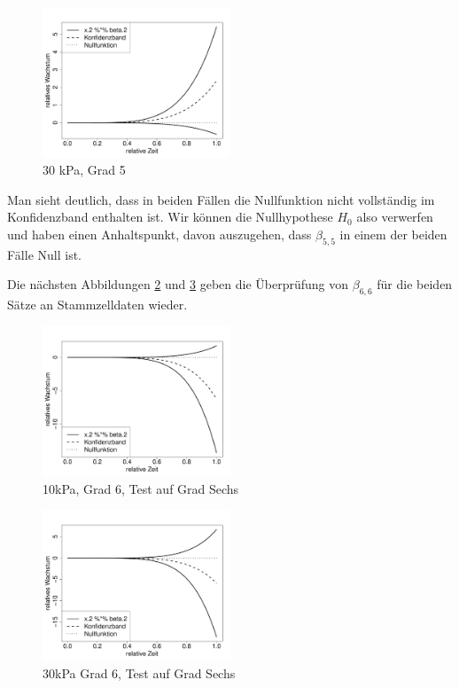 \documentclass[12pt,a4paper]{article}
\theoremstyle{definition}
\theoremstyle{definition}
\theoremstyle{definition}
\theoremstyle{definition}
\begin{document}
\begin{figure}[H] 
  \centering
     \includegraphics[width=0.5\textwidth]{30kPa-Grad-5-KB}
  \caption{30 kPa, Grad 5}
  \label{30kPa Grad 5}
\end{figure}

Man sieht deutlich, dass in beiden Fällen die Nullfunktion nicht vollständig im Konfidenzband enthalten ist. Wir können die Nullhypothese $H_0$ also verwerfen und haben einen Anhaltspunkt, davon auszugehen, dass $\beta_{5,5}$ in einem der beiden Fälle Null ist.

Die nächsten Abbildungen \ref{10kPa Grad 6.1} und \ref{30kPa Grad 6.1} geben  die Überprüfung von $\beta_{6,6}$ für die beiden Sätze an Stammzelldaten wieder.

\begin{figure}[H] 
  \centering
     \includegraphics[width=0.5\textwidth]{10kPa-Grad-6-1-KB}
  \caption{10kPa, Grad 6, Test auf Grad Sechs}
  \label{10kPa Grad 6.1}
\end{figure}

\begin{figure}[H] 
  \centering
     \includegraphics[width=0.5\textwidth]{30kPa-Grad-6-1-KB}
  \caption{30kPa Grad 6, Test auf Grad Sechs}
  \label{30kPa Grad 6.1}
\end{figure}
\end{document}
